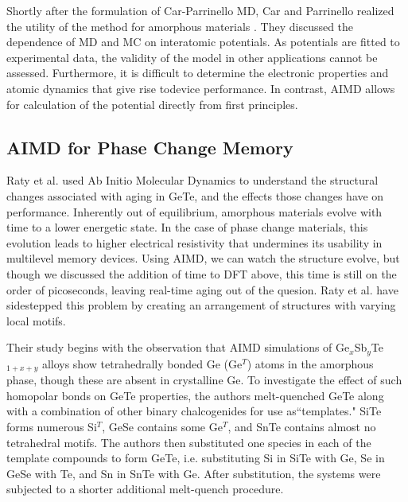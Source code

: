\documentclass[3p,review,12pt]{elsarticle}
\begin{document}
\par
Shortly after the formulation of Car-Parrinello MD, Car and Parrinello realized the utility of the method for amorphous materials \cite{Car1988}. They discussed the dependence of MD and MC on interatomic potentials. As potentials are fitted to experimental data, the validity of the model in other applications cannot be assessed. Furthermore, it is difficult to determine the electronic properties and atomic dynamics that give rise todevice performance. In contrast, AIMD allows for calculation of the potential directly from first principles.

\subsection{AIMD for Phase Change Memory}
Raty et al. \cite{Raty2015} used Ab Initio Molecular Dynamics to understand the structural changes associated with aging in GeTe, and the effects those changes have on performance. Inherently out of equilibrium, amorphous materials evolve with time to a lower energetic state. In the case of phase change materials, this evolution leads to higher electrical resistivity that undermines its usability in multilevel memory devices. Using AIMD, we can watch the structure evolve, but though we discussed the addition of time to DFT above, this time is still on the order of picoseconds, leaving real-time aging out of the quesion. Raty et al. have sidestepped this problem by creating an arrangement of structures with varying local motifs. 
\par
Their study begins with the observation that AIMD simulations of Ge$_{x}$Sb$_{y}$Te$_{1+x+y}$ alloys show tetrahedrally bonded Ge (Ge$^{T}$) atoms in the amorphous phase, though these are absent in crystalline Ge. To investigate the effect of such homopolar bonds on GeTe properties, the authors melt-quenched GeTe along with a combination of other binary chalcogenides for use as``templates." SiTe forms numerous Si$^{T}$, GeSe contains some Ge$^{T}$, and SnTe contains almost no tetrahedral motifs.  The authors then substituted one species in each of the template compounds to form GeTe, i.e. substituting Si in SiTe with Ge, Se in GeSe with Te, and Sn in SnTe with Ge. After substitution, the systems were subjected to a shorter additional melt-quench procedure.
\end{document}
